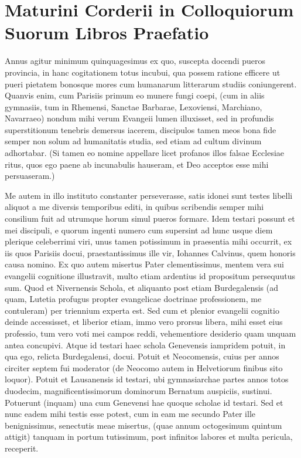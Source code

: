 \documentclass{article}
\begin{document}
\section*{Maturini Corderii in Colloquiorum Suorum Libros Praefatio}
Annus agitur minimum quinquagesimus ex quo, suscepta docendi pueros provincia, in hanc cogitationem totus incubui, qua possem ratione efficere ut pueri pietatem bonosque mores cum humanarum litterarum studiis coniungerent. Quanvis enim, cum Parisiis primum eo munere fungi coepi, (cum in aliis gymnasiis, tum in Rhemensi, Sanctae Barbarae, Lexoviensi, Marchiano, Navarraeo) nondum mihi verum Evangeii lumen illuxisset, sed in profundis superstitionum tenebris demersus iacerem, discipulos tamen meos bona fide semper non solum ad humanitatis studia, sed etiam ad cultum divinum adhortabar. (Si tamen eo nomine appellare licet profanos illos falsae Ecclesiae ritus, quos ego paene ab incunabulis hauseram, et Deo acceptos esse mihi persuaseram.)

Me autem in illo instituto constanter perseverasse, satis idonei sunt testes libelli aliquot a me diversis temporibus editi, in quibus scribendis semper mihi consilium fuit ad utrumque horum simul pueros formare. Idem testari possunt et mei discipuli, e quorum ingenti numero cum supersint ad hunc usque diem plerique celeberrimi viri, unus tamen potissimum in praesentia mihi occurrit, ex iis quos Parisiis docui, praestantissimus ille vir, Iohannes Calvinus, quem honoris causa nomino. Ex quo autem misertus Pater clementissimus, mentem vera sui evangelii cognitione illustravit, multo etiam ardentius id propositum persequutus sum. Quod et Nivernensis Schola, et aliquanto post etiam Burdegalensis (ad quam, Lutetia profugus propter evangelicae doctrinae professionem, me contuleram) per triennium experta est. Sed cum et plenior evangelii cognitio deinde accessisset, et liberior etiam, immo vero prorsus libera, mihi esset eius professio, tum vero voti mei campos reddi, vehementiore desiderio quam unquam antea concupivi. Atque id testari haec schola Genevensis iampridem potuit, in qua ego, relicta Burdegalensi, docui. Potuit et Neocomensis, cuius per annos circiter septem fui moderator (de Neocomo autem in Helvetiorum finibus sito loquor). Potuit et Lausanensis id testari, ubi gymnasiarchae partes annos totos duodecim, magnificentissimorum dominorum Bernatum auspiciis, sustinui. Potuerunt (inquam) una cum Genevensi hae quoque scholae id testari. Sed et nunc eadem mihi testis esse potest, cum in eam me secundo Pater ille benignissimus, senectutis meae misertus, (quae annum octogesimum quintum attigit) tanquam in portum tutissimum, post infinitos labores et multa pericula, receperit.
\end{document}
